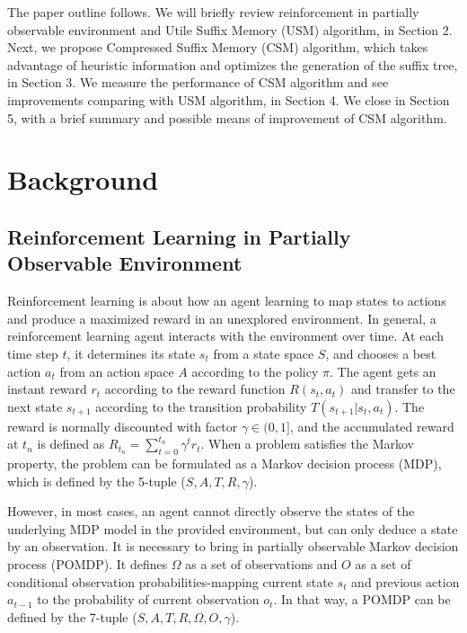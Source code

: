 \documentclass[conference]{IEEEtran}
\begin{document}
	The paper outline follows. We will briefly review reinforcement in partially observable
	environment and Utile Suffix Memory (USM) algorithm, in Section 2.
	Next, we propose Compressed Suffix Memory (CSM) algorithm, which takes advantage of
	heuristic information and optimizes the generation of the suffix tree, in Section 3.
	We measure the performance of CSM algorithm and see improvements comparing with USM algorithm, in Section 4.
	We close in Section 5, with a brief summary and possible means of improvement of CSM algorithm.
	
	\section{Background}
	
	\subsection{Reinforcement Learning in Partially Observable Environment}
	
	Reinforcement learning is about how an agent learning to map states to actions
	and produce a maximized reward in an unexplored environment. In general, a
	reinforcement learning agent interacts with the environment over time.
	At each time step $t$, it determines its state $s_t$ from a state space $S$,
	and chooses a best action $a_t$ from an action space $A$ according to the policy
	$\pi$. The agent gets an instant reward $r_t$ according to the reward function
	$R(s_t, a_t)$ and transfer to the next state $s_{t+1}$ according to the transition
	probability $T(s_{t+1}|s_t, a_t)$. The reward is normally discounted with factor
	$\gamma\in(0,1]$, and the   accumulated reward at $t_n$ is defined as
	$R_{t_n}=\sum_{t=0}^{t_n} \gamma^t r_t$. When a problem satisfies the Markov
	property, the problem can be formulated as a Markov decision process (MDP), which
	is defined by the 5-tuple ($S, A, T, R, \gamma$).
	
	However, in most cases, an agent cannot directly observe the states of the
	underlying MDP model in the provided environment, but can only deduce a state by an
	observation. It is necessary to bring in partially observable Markov decision
	process (POMDP). It defines $\Omega$ as a set of observations and $O$ as a set of
	conditional observation probabilities-mapping current state $s_t$ and
	previous action $a_{t-1}$ to the probability of current observation $o_t$. 
	In that way, a POMDP can be defined by the 7-tuple ($S, A, T, R, \Omega, O, \gamma$).
	
\end{document}
